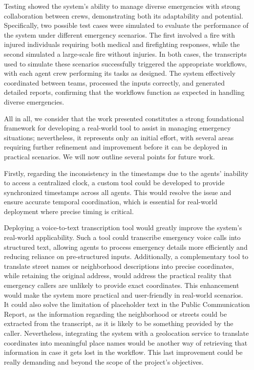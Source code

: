 \documentclass[a4paper]{article}
\begin{document}
 Testing showed the system’s ability to manage diverse emergencies with strong collaboration between crews, demonstrating both its
  adaptability and potential. Specifically, two possible test cases were simulated to evaluate the performance of the system under different emergency scenarios. The first involved a
   fire with injured individuals requiring both medical and firefighting responses, while the second simulated a large-scale fire without 
   injuries. In both cases, the transcripts used to simulate these scenarios successfully triggered the appropriate workflows, with each agent
    crew performing its tasks as designed. The system effectively coordinated between teams, processed the inputs correctly, and generated
     detailed reports, confirming that the workflows function as expected in handling diverse emergencies.

All in all, we consider that the work presented constitutes a strong foundational framework for developing a real-world tool to assist in 
managing emergency situations; nevertheless, it represents only an initial effort, with several areas requiring further refinement and 
improvement before it can be deployed in practical scenarios. We will now outline several points for future work.


Firstly, regarding the inconsistency in the timestamps due to the agents' inability to access a centralized clock, a custom tool could be 
developed to provide synchronized timestamps across all agents. This would resolve the issue and ensure accurate temporal coordination,
 which is essential for real-world deployment where precise timing is critical.

Deploying a voice-to-text transcription tool would greatly improve the system's real-world applicability. Such a tool could transcribe
 emergency voice calls into structured text, allowing agents to process emergency details more efficiently and reducing reliance on 
 pre-structured inputs. Additionally, a complementary tool to translate street names or neighborhood descriptions into precise coordinates,
  while retaining the original address, would address the practical reality that emergency callers are unlikely to provide exact coordinates. 
  This enhancement would make the system more practical and user-friendly in real-world scenarios. It could also solve the limitation of 
  placeholder text in the Public Communication Report, as the information regarding the neighborhood or streets could be extracted from 
  the transcript, as it is likely to be something provided by the caller. Nevertheless, integrating the system with a geolocation service to translate coordinates into meaningful place names would be another way
 of retrieving that information in case it gets lost in the workflow. This last improvement could be really demanding and beyond the scope 
 of the project's objectives.
\end{document}
